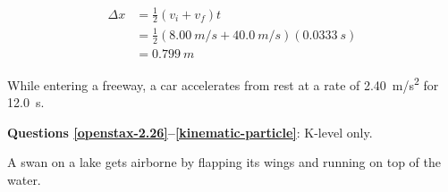 \documentclass[]{exam}
\theoremstyle{definition}
\begin{document}
\begin{questions}
\begin{solution}
\begin{align*}
    \Delta x &= \frac{1}{2} \left(v_i + v_f\right) t \\[1ex]
    &= \frac{1}{2} \left(\SI{8.00}{m/s} + \SI{40.0}{m/s}\right)(\SI{0.0333}{s}) \\[1ex]
    &= \boxed{\SI{0.799}{m}}
\end{align*}
\end{solution}

\question %
While entering a freeway, a car accelerates from rest at a rate of \SI{2.40}{m/s^2} for \SI{12.0}{s}. 


\begin{EnvUplevel}
    \textbf{Questions \ref{openstax-2.26}--\ref{kinematic-particle}}: K-level only.
\end{EnvUplevel}






\question \label{openstax-2.31}
A swan on a lake gets airborne by flapping its wings and running on top of the water. 


\end{questions}
\end{document}
